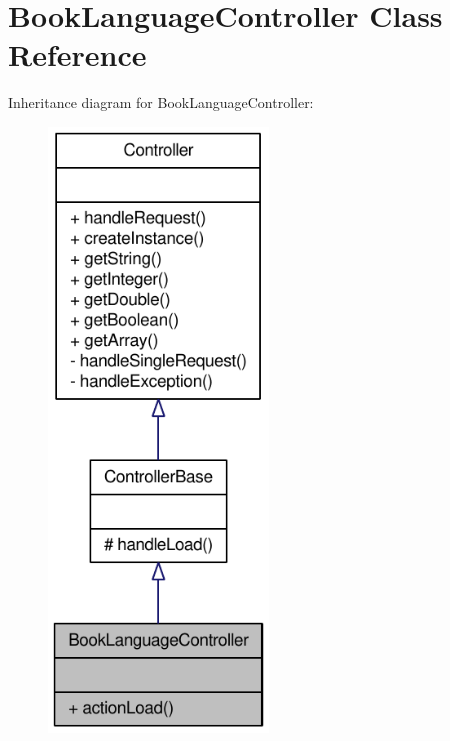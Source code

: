 \hypertarget{classBookLanguageController}{
\section{BookLanguageController Class Reference}
\label{classBookLanguageController}
}


Inheritance diagram for BookLanguageController:\nopagebreak
\begin{figure}[H]
\begin{center}
\leavevmode
\includegraphics[width=166pt]{classBookLanguageController__inherit__graph}
\end{center}
\end{figure}


